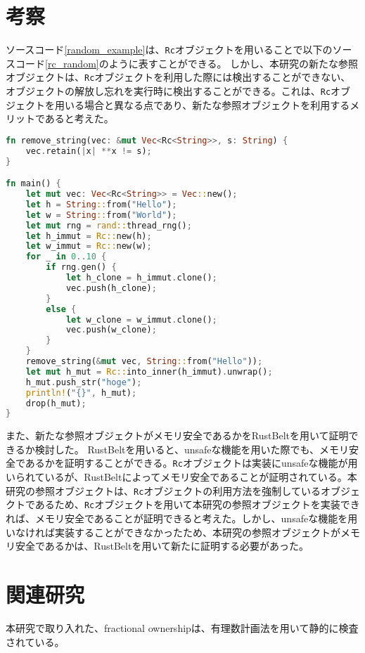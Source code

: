 \documentclass{sumiilab-paper}
\theoremstyle{mystyle}
\numberwithin{definition}{chapter} %
\begin{document}
\chapter{考察}
ソースコード\ref{random_example}は、\texttt{Rc}オブジェクトを用いることで以下のソースコード\ref{rc_random}のように表すことができる。
しかし、本研究の新たな参照オブジェクトは、\texttt{Rc}オブジェクトを利用した際には検出することができない、オブジェクトの解放し忘れを実行時に検出することができる。これは、\texttt{Rc}オブジェクトを用いる場合と異なる点であり、新たな参照オブジェクトを利用するメリットであると考えた。
\begin{lstlisting}[language=Rust, caption=新たな参照オブジェクトを用いた並列処理の例, label=rc_random, captionpos=b]
fn remove_string(vec: &mut Vec<Rc<String>>, s: String) {
    vec.retain(|x| **x != s);
}

fn main() {
    let mut vec: Vec<Rc<String>> = Vec::new();
    let h = String::from("Hello");
    let w = String::from("World");
    let mut rng = rand::thread_rng();
    let h_immut = Rc::new(h);
    let w_immut = Rc::new(w);
    for _ in 0..10 {
        if rng.gen() {
            let h_clone = h_immut.clone();
            vec.push(h_clone);
        }
        else {
            let w_clone = w_immut.clone();
            vec.push(w_clone);
        }
    }
    remove_string(&mut vec, String::from("Hello"));
    let mut h_mut = Rc::into_inner(h_immut).unwrap();
    h_mut.push_str("hoge");
    println!("{}", h_mut);
    drop(h_mut);
}
\end{lstlisting}

また、新たな参照オブジェクトがメモリ安全であるかをRustBelt\cite{10.1145/3158154}を用いて証明できるか検討した。
RustBeltを用いると、unsafeな機能を用いた際でも、メモリ安全であるかを証明することができる。\texttt{Rc}オブジェクトは実装にunsafeな機能が用いられているが、RustBeltによってメモリ安全であることが証明されている。本研究の参照オブジェクトは、\texttt{Rc}オブジェクトの利用方法を強制しているオブジェクトであるため、\texttt{Rc}オブジェクトを用いて本研究の参照オブジェクトを実装できれば、メモリ安全であることが証明できると考えた。しかし、unsafeな機能を用いなければ実装することができなかったため、本研究の参照オブジェクトがメモリ安全であるかは、RustBeltを用いて新たに証明する必要があった。

\chapter{関連研究}
本研究で取り入れた、fractional ownership\cite{10.1007/3-540-44898-5_4}は、有理数計画法を用いて静的に検査されている。
\end{document}
